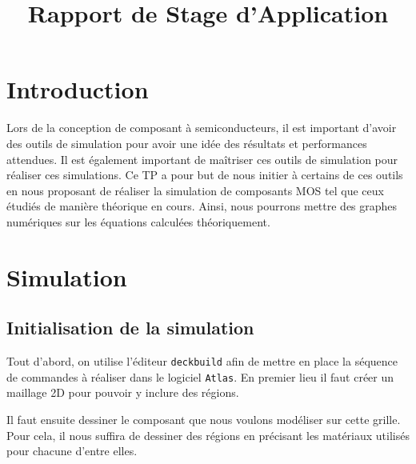 \documentclass[a4paper,11pt]{report}
\title{Rapport de Stage d'Application}
\begin{document}


\chapter{Introduction}
Lors de la conception de composant à semiconducteurs, il est important d'avoir des outils de simulation pour avoir une idée des résultats et performances attendues. Il est également important de maîtriser ces outils de simulation pour réaliser ces simulations. Ce TP a pour but de nous initier à certains de ces outils en nous proposant de réaliser la simulation de composants MOS tel que ceux étudiés de manière théorique en cours. Ainsi, nous pourrons mettre des graphes  numériques sur les équations calculées théoriquement.

\chapter{Simulation}

\section{Initialisation de la simulation}

Tout d'abord, on utilise l'éditeur \texttt{deckbuild} afin de mettre en place la séquence de commandes à réaliser dans le logiciel \texttt{Atlas}. En premier lieu il faut créer un maillage 2D pour pouvoir y inclure des régions.
\vspace{0.3cm}

\vspace{0.3cm}

Il faut ensuite dessiner le composant que nous voulons modéliser sur cette grille. Pour cela, il nous suffira de dessiner des régions en précisant les matériaux utilisés pour chacune d'entre elles.
\vspace{0.3cm}
\end{document}

